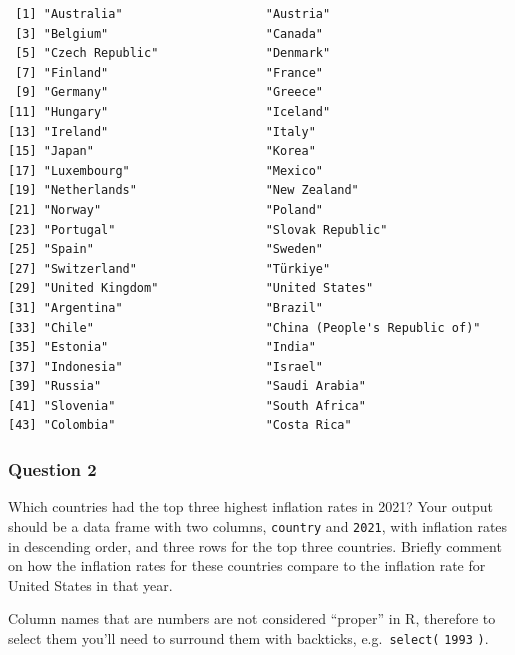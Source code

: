 \documentclass[
  letterpaper,
  DIV=11,
  numbers=noendperiod]{scrartcl}
\begin{document}
\begin{verbatim}
 [1] "Australia"                    "Austria"                     
 [3] "Belgium"                      "Canada"                      
 [5] "Czech Republic"               "Denmark"                     
 [7] "Finland"                      "France"                      
 [9] "Germany"                      "Greece"                      
[11] "Hungary"                      "Iceland"                     
[13] "Ireland"                      "Italy"                       
[15] "Japan"                        "Korea"                       
[17] "Luxembourg"                   "Mexico"                      
[19] "Netherlands"                  "New Zealand"                 
[21] "Norway"                       "Poland"                      
[23] "Portugal"                     "Slovak Republic"             
[25] "Spain"                        "Sweden"                      
[27] "Switzerland"                  "Türkiye"                     
[29] "United Kingdom"               "United States"               
[31] "Argentina"                    "Brazil"                      
[33] "Chile"                        "China (People's Republic of)"
[35] "Estonia"                      "India"                       
[37] "Indonesia"                    "Israel"                      
[39] "Russia"                       "Saudi Arabia"                
[41] "Slovenia"                     "South Africa"                
[43] "Colombia"                     "Costa Rica"                  
\end{verbatim}

\subsubsection{Question 2}\label{question-2}

Which countries had the top three highest inflation rates in 2021? Your
output should be a data frame with two columns, \texttt{country} and
\texttt{2021}, with inflation rates in descending order, and three rows
for the top three countries. Briefly comment on how the inflation rates
for these countries compare to the inflation rate for United States in
that year.

\begin{tcolorbox}[enhanced jigsaw, toptitle=1mm, bottomrule=.15mm, colbacktitle=quarto-callout-tip-color!10!white, colframe=quarto-callout-tip-color-frame, leftrule=.75mm, breakable, toprule=.15mm, colback=white, arc=.35mm, coltitle=black, left=2mm, opacitybacktitle=0.6, bottomtitle=1mm, opacityback=0, title=\textcolor{quarto-callout-tip-color}{\faLightbulb}\hspace{0.5em}{Tip}, titlerule=0mm, rightrule=.15mm]

Column names that are numbers are not considered ``proper'' in R,
therefore to select them you'll need to surround them with backticks,
e.g.~\texttt{select(} \texttt{\textasciigrave{}} \texttt{1993}
\texttt{\textasciigrave{}} \texttt{)}.

\end{tcolorbox}
\end{document}
